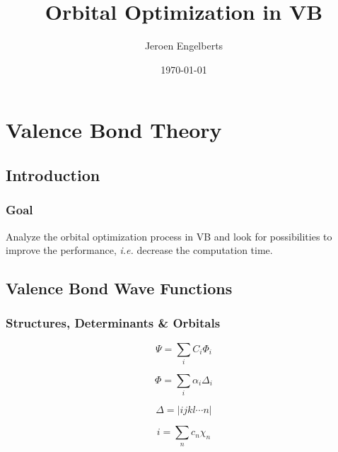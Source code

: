 \documentclass[]{beamer}
\title{Orbital Optimization in VB}    %
\author{Jeroen Engelberts}            %
\date{\today}                         %
\begin{document}
\begin{frame}
  \titlepage
\end{frame}

\section[Outline]{}

\begin{frame}
  \tableofcontents
\end{frame}


\section{Valence Bond Theory}
\subsection{Introduction}
\begin{frame}
  \frametitle{Goal}   %
  Analyze the orbital optimization process in VB and look for possibilities to improve the performance, \textit{i.e.} decrease the computation time.
\end{frame}

\subsection{Valence Bond Wave Functions}
\begin{frame}
  \frametitle{Structures, Determinants \& Orbitals}
  \begin{equation*}
    \Psi = \sum_{i} C_i \Phi_i
  \end{equation*}

  \begin{equation*}
    \Phi = \sum_{i} \alpha_i \Delta_i
  \end{equation*}

  \begin{equation*}
    \Delta = |ijkl \cdots n|
  \end{equation*}

  \begin{equation*}
    i = \sum_{n} c_n \chi_n
  \end{equation*}
\end{frame}
\end{document}
